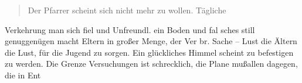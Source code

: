 \pend
\begin{verse}
Der Pfarrer scheint sich nicht mehr zu wollen. Tägliche
\end{verse}
\pstart
Verkehrung man sich fiel und Unfreundl. ein Boden und fal\ohb
sches still genuggenügen macht Eltern in großer Menge, der Ver\ohb
br. Sache – Lust die Ältern die Lust, für die Jugend zu sorgen.\ob
Ein glückliches Himmel scheint zu befestigen zu werden. Die Grenze\ob
Versuchungen ist schrecklich, die Plane mußallen\unsicher{} dagegen, die in Ent\unsicher
\pend
